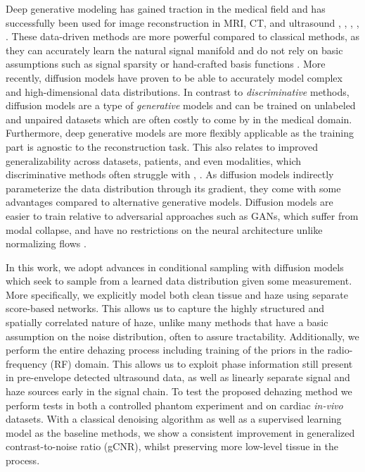 \documentclass[journal,twoside,web]{ieeecolor}
\newcommand{\TSW}[1]{{\textcolor{black}{#1}}}
\begin{document}
Deep generative modeling has gained traction in the medical field and has successfully been used for image reconstruction in MRI, CT, and ultrasound \cite{yangDAGANDeepDeAliasing2018}, \cite{youCTSuperResolutionGAN2020}, \cite{songSolvingInverseProblems2022}, \cite{vandeschaftUltrasoundSpeckleSuppression2021}, \cite{chungScorebasedDiffusionModels2022}. These data-driven methods are more powerful compared to classical methods, as they can accurately learn the natural signal manifold and do not rely on basic assumptions such as signal sparsity or hand-crafted basis functions \cite{vanslounDeepLearningUltrasound2020}. More recently, diffusion models have proven to be able to accurately model complex and high-dimensional data distributions. In contrast to \emph{discriminative} methods, diffusion models are a type of \emph{generative} models and can be trained on unlabeled and unpaired datasets which are often costly to come by in the medical domain. Furthermore, deep generative models are more flexibly applicable as the training part is agnostic to the reconstruction task. This also relates to improved generalizability across datasets, patients, and even modalities, which discriminative methods often struggle with \cite{zhangDeepStableLearning2021}, \cite{chatterjeeGeneralizationMysteryDeep2022}. As diffusion models indirectly parameterize the data distribution through its gradient, they come with some advantages compared to alternative generative models. Diffusion models are easier to train relative to adversarial approaches such as GANs, which suffer from modal collapse, and have no restrictions on the neural architecture unlike normalizing flows \TSW{\cite{kingma2018glow}}. 

In this work, we adopt advances in conditional sampling with diffusion models which seek to sample from a learned data distribution given some measurement. More specifically, we explicitly model both clean tissue and haze using separate score-based networks. This allows us to capture the highly structured and spatially correlated nature of haze, unlike many methods that have a basic assumption on the noise distribution, often to assure tractability. Additionally, we perform the entire dehazing process including training of the priors in the radio-frequency (RF) domain. This allows us to exploit phase information still present in pre-envelope detected ultrasound data, as well as linearly separate signal and haze sources early in the signal chain. To test the proposed dehazing method we perform tests in both a controlled phantom experiment and on cardiac \emph{in-vivo} datasets. With a classical denoising algorithm as well as a supervised learning model as the baseline methods, we show a consistent improvement in generalized contrast-to-noise ratio (gCNR), whilst preserving more low-level tissue in the process.
\end{document}
